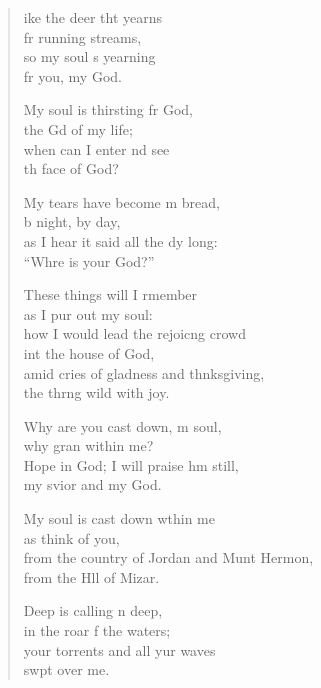 \settowidth{\versewidth}{from the country of Jordan and Mount Hermon, *}
\begin{verse}%
  \begin{patverse}
ike the deer tht yearns\Med\\
fr running streams,\\
so my soul \pointup{\i}s yearning\Med\\
fr you, my God.

My soul is thirsting fr God,\Med\\
the Gd of my life;\\
when can I enter nd see\Med\\
th face of God?

My tears have become m bread,\Med\\
b night, by day,\\
as I hear it said all the dy long:\Med\\
“Whre is your God?”

These things will I rmember\Med\\
as I pur out my soul:\\
how I would lead the rejoic\pointup{\i}ng crowd\Med\\
int the house of God,\\
amid cries of gladness and thnksgiving,\Med\\
the thrng wild with joy.

Why are you cast down, m soul,\Med\\
why gran within me?\\
Hope in God; I will praise h\pointup{\i}m still,\Med\\
my svior and my God.

My soul is cast down w\pointup{\i}thin me\Med\\
as  think of you,\\
from the country of Jordan and Munt Hermon,\Med\\
from the Hll of Mizar.

Deep is calling n deep,\Med\\
in the roar f the waters;\\
your torrents and all yur waves\Med\\
swpt over me.


\end{patverse}
\end{verse}
